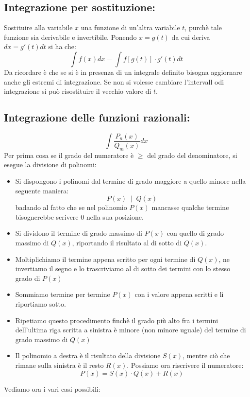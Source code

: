 \subsection{Integrazione per sostituzione:}
Sostituire alla variabile $x$ una funzione di un'altra variabile $t$, purchè tale funzione sia derivabile e invertibile.\newline
Ponendo $x = g(t)$ da cui deriva $dx = g'(t) dt$ si ha che:
\[
    \int f(x) dx = \int f[g(t)] \cdot g'(t) dt
\]
Da ricordare è che se si è in presenza di un integrale definito bisogna aggiornare anche gli estremi di integrazione. Se non si volesse cambiare l'intervall odi integrazione si può risostituire il vecchio valore di $t$.
\subsection{Integrazione delle funzioni razionali:}
\[
    \int \frac{P_n(x)}{Q_m(x)} dx
\]
Per prima cosa se il grado del numeratore è $\geq$ del grado del denominatore, si esegue la divisione di polinomi:
\begin{itemize}
    \item Si dispongono i polinomi dal termine di grado maggiore a quello minore nella seguente maniera:
    \[
        P(x) \;\; | \;\; Q(x)    
    \]
    badando al fatto che se nel polinomio $P(x)$ mancasse qualche termine bisognerebbe scrivere $0$ nella sua posizione.
    \item Si dividono il termine di grado massimo di $P(x)$ con quello di grado massimo di $Q(x)$, riportando il risultato al di sotto di $Q(x)$.
    \item Moltiplichiamo il termine appena scritto per ogni termine di $Q(x)$, ne invertiamo il segno e lo trascriviamo al di sotto dei termini con lo stesso grado di $P(x)$
    \item Sommiamo termine per termine $P(x)$ con i valore appena scritti e li riportiamo sotto.
    \item Ripetiamo questo procedimento finchè il grado più alto fra i termini dell'ultima riga scritta a sinistra è minore (non minore uguale) del termine di grado massimo di $Q(x)$
    \item Il polinomio a destra è il risultato della divisione $S(x)$, mentre ciò che rimane sulla sinistra è il resto $R(x)$. Possiamo ora riscrivere il numeratore:
    \[
        P(x) = S(x) \cdot Q(x) + R(x)
    \]
\end{itemize}
Vediamo ora i vari casi possibili:
